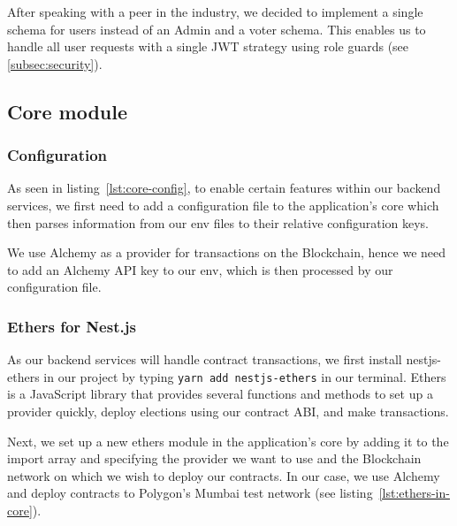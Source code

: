 After speaking with a peer in the industry, we decided to implement a single schema for users instead of an \gls{Admin} and a voter schema.
This enables us to handle all user requests with a single \gls{JWT} strategy using role guards (see \cref{subsec:security}).

\subsection{Core module}\label{subsec:core-module}

\subsubsection{Configuration}

As seen in listing~\ref{lst:core-config}, to enable certain features within our backend services, we first need to add a configuration file to the application's core which then parses information from our env files to their relative configuration keys.


We use Alchemy as a provider for transactions on the \gls{Blockchain}, hence we need to add an Alchemy \gls{API} key to our env, which is then processed by our configuration file.

\subsubsection{Ethers for Nest.js}

As our backend services will handle contract transactions, we first install nestjs-ethers in our project by typing \texttt{yarn add nestjs-ethers} in our terminal.
Ethers is a JavaScript library that provides several functions and methods to set up a provider quickly, deploy elections using our contract \gls{ABI}, and make transactions.

Next, we set up a new ethers module in the application's core by adding it to the import array and specifying the provider we want to use and the \gls{Blockchain} network on which we wish to deploy our contracts.
In our case, we use Alchemy and deploy contracts to Polygon’s Mumbai test network (see listing~\ref{lst:ethers-in-core}).


